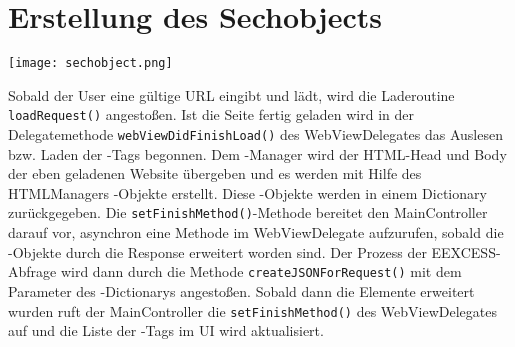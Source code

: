 \section{Erstellung des Sechobjects}

\texttt{[image: sechobject.png]}

Sobald der User eine gültige URL eingibt und lädt, wird die Laderoutine \Verb|loadRequest()|
angestoßen. Ist die Seite fertig geladen wird in der Delegatemethode \Verb|webViewDidFinishLoad()|
des WebViewDelegates das Auslesen bzw. Laden der \SEACH-Tags begonnen.
Dem \SEACH-Manager wird der HTML-Head und Body der eben geladenen Website übergeben und es
werden mit Hilfe des HTMLManagers \SEACH-Objekte erstellt. Diese \SEACH-Objekte werden in einem
Dictionary zurückgegeben.
Die \Verb|setFinishMethod()|-Methode bereitet den MainController darauf vor, asynchron eine Methode
im WebViewDelegate aufzurufen, sobald die \SEACH-Objekte durch die Response erweitert worden
sind. Der Prozess der EEXCESS-Abfrage wird dann durch die Methode \Verb|createJSONForRequest()| mit
dem Parameter des \SEACH-Dictionarys angestoßen. Sobald dann die Elemente erweitert wurden ruft
der MainController die \Verb|setFinishMethod()| des WebViewDelegates auf und die Liste der \SEACH-Tags
im UI wird aktualisiert.
